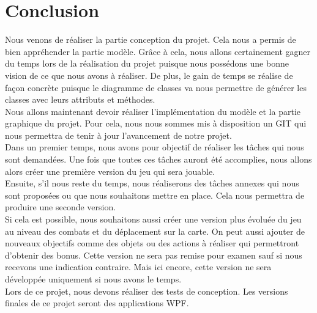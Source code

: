 \documentclass[a4paper,11pt]{article}
\begin{document}
\section{Conclusion}
Nous venons de réaliser la partie conception du projet. Cela nous a permis de bien appréhender la partie modèle. Grâce à cela, nous allons certainement gagner du temps lors de la réalisation du projet puisque nous possédons une bonne vision de ce que nous avons à réaliser. De plus, le gain de temps se réalise de façon concrète puisque le diagramme de classes va nous permettre de générer les classes avec leurs attributs et méthodes.\medskip\\
Nous allons maintenant devoir réaliser l'implémentation du modèle et la partie graphique du projet. Pour cela, nous nous sommes mis à disposition un GIT qui nous permettra de tenir à jour l'avancement de notre projet.\medskip\\
Dans un premier temps, nous avons pour objectif de réaliser les tâches qui nous sont demandées. Une fois que toutes ces tâches auront été accomplies, nous allons alors créer une première version du jeu qui sera jouable.\medskip\\
Ensuite, s'il nous reste du temps, nous réaliserons des tâches annexes qui nous sont proposées ou que nous souhaitons mettre en place. Cela nous permettra de produire une seconde version.\medskip\\
Si cela est possible, nous souhaitons aussi créer une version plus évoluée du jeu au niveau des combats et du déplacement sur la carte. On peut aussi ajouter de nouveaux objectifs comme des objets ou des actions à réaliser qui permettront d'obtenir des bonus. Cette version ne sera pas remise pour examen sauf si nous recevons une indication contraire. Mais ici encore, cette version ne sera développée uniquement si nous avons le temps.\medskip\\
Lors de ce projet, nous devons réaliser des tests de conception. Les versions finales de ce projet seront des applications WPF.
\newpage
\listoffigures
\end{document}
